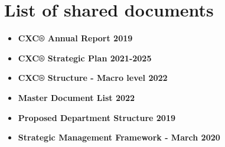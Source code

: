 \documentclass[
  10pt,
]{book}
\begin{document}
\hypertarget{appendixD}{%
\chapter{List of shared documents}\label{appendixD}}

\begin{itemize}
\item
  \textbf{CXC® Annual Report 2019}
\item
  \textbf{CXC® Strategic Plan 2021-2025}
\item
  \textbf{CXC® Structure - Macro level 2022}
\item
  \textbf{Master Document List 2022}
\item
  \textbf{Proposed Department Structure 2019}
\item
  \textbf{Strategic Management Framework - March 2020}
\end{itemize}

  
\end{document}
